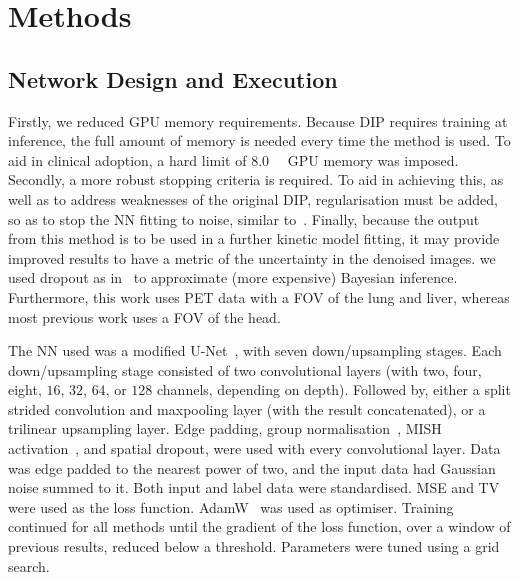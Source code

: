         \section{Methods}\label{sec:pseudo_bayesian_dip_denoising_as_a_preprocessing_step_for_kinetic_modelling_in_dynamic_pet_appendix_methods}
            \subsection{Network Design and Execution} \label{sec:pseudo_bayesian_dip_denoising_as_a_preprocessing_step_for_kinetic_modelling_in_dynamic_pet_appendix_methods_network_design_and_execution}
                Firstly, we reduced \gls{GPU} memory requirements. Because \gls{DIP} requires training at inference, the full amount of memory is needed every time the method is used. To aid in clinical adoption, a hard limit of \SI{8.0}{\giga\byte} \gls{GPU} memory was imposed. Secondly, a more robust stopping criteria is required. %
                To aid in achieving this, as well as to address weaknesses of the original \gls{DIP}, regularisation must be added, so as to stop the \gls{NN} fitting to noise, similar to~\cite{Liu2019ImagePrior}. Finally, because the output from this method is to be used in a further kinetic model fitting, it may provide improved results to have a metric of the uncertainty in the denoised images. we used dropout as in~\cite{Gal2015DropoutLearning} to approximate (more expensive) Bayesian inference. Furthermore, this work uses \gls{PET} data with a \gls{FOV} of the lung and liver, whereas most previous work uses a \gls{FOV} of the head.
            
                The \gls{NN} used was a modified U-Net~\cite{Weng2015U-Net:Segmentation}, with seven down/upsampling stages. Each down/upsampling stage consisted of two convolutional layers (with two, four, eight, $16$, $32$, $64$, or $128$ channels, depending on depth). Followed by, either a split strided convolution and maxpooling layer (with the result concatenated), or a trilinear upsampling layer. Edge padding, group normalisation~\cite{Wu2018GroupNormalization}, MISH activation~\cite{Misra2020Mish:Function}, and spatial dropout, were used with every convolutional layer. Data was edge padded to the nearest power of two, and the input data had Gaussian noise summed to it. Both input and label data were standardised. \gls{MSE} and \gls{TV} were used as the loss function. AdamW~\cite{Loshchilov2017DecoupledRegularization} was used as optimiser. Training continued for all methods until the gradient of the loss function, over a window of previous results, reduced below a threshold. Parameters were tuned using a grid search.
                
